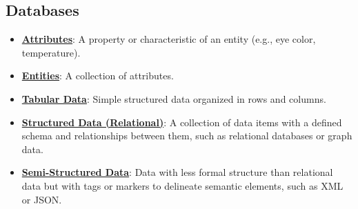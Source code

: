 \documentclass{article}%
\begin{document}
\subsection{Databases}%
\label{subsec:Databases}%
\begin{itemize}[leftmargin=*]%
\item \href{https://purdue.brightspace.com/d2l/common/assets/pdfjs-d2l-dist/1.0.14-legacy/web/viewer.html?file=\%2Fcontent\%2Fenforced\%2F1095465-WL.202510.CS24200.LE1\%2F04L1-data.pdf\%3Fou\%3D1095465\&lang=en-us\&container=d2l-fileviewer-rendered-pdf\&fullscreen=d2l-fileviewer-rendered-pdf-dialog\&height=667#page=6}{\textbf{Attributes}}: A property or characteristic of an entity (e.g., eye color, temperature).%
\item \href{https://purdue.brightspace.com/d2l/common/assets/pdfjs-d2l-dist/1.0.14-legacy/web/viewer.html?file=\%2Fcontent\%2Fenforced\%2F1095465-WL.202510.CS24200.LE1\%2F04L1-data.pdf\%3Fou\%3D1095465\&lang=en-us\&container=d2l-fileviewer-rendered-pdf\&fullscreen=d2l-fileviewer-rendered-pdf-dialog\&height=667#page=6}{\textbf{Entities}}: A collection of attributes.%
\item \href{https://purdue.brightspace.com/d2l/common/assets/pdfjs-d2l-dist/1.0.14-legacy/web/viewer.html?file=\%2Fcontent\%2Fenforced\%2F1095465-WL.202510.CS24200.LE1\%2F04L1-data.pdf\%3Fou\%3D1095465\&lang=en-us\&container=d2l-fileviewer-rendered-pdf\&fullscreen=d2l-fileviewer-rendered-pdf-dialog\&height=667#page=7}{\textbf{Tabular Data}}: Simple structured data organized in rows and columns.%
\item \href{https://purdue.brightspace.com/d2l/common/assets/pdfjs-d2l-dist/1.0.14-legacy/web/viewer.html?file=\%2Fcontent\%2Fenforced\%2F1095465-WL.202510.CS24200.LE1\%2F04L1-data.pdf\%3Fou\%3D1095465\&lang=en-us\&container=d2l-fileviewer-rendered-pdf\&fullscreen=d2l-fileviewer-rendered-pdf-dialog\&height=667#page=8}{\textbf{Structured Data (Relational)}}: A collection of data items with a defined schema and relationships between them, such as relational databases or graph data.%
\item \href{https://purdue.brightspace.com/d2l/common/assets/pdfjs-d2l-dist/1.0.14-legacy/web/viewer.html?file=\%2Fcontent\%2Fenforced\%2F1095465-WL.202510.CS24200.LE1\%2F04L1-data.pdf\%3Fou\%3D1095465\&lang=en-us\&container=d2l-fileviewer-rendered-pdf\&fullscreen=d2l-fileviewer-rendered-pdf-dialog\&height=667#page=9}{\textbf{Semi-Structured Data}}: Data with less formal structure than relational data but with tags or markers to delineate semantic elements, such as XML or JSON.%

\end{itemize}
\end{document}
